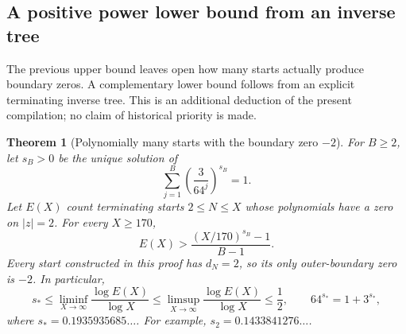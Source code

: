 \documentclass[11pt,a4paper]{article}
\newtheorem{theorem}{Theorem}[section]
\theoremstyle{definition}
\theoremstyle{remark}
\numberwithin{equation}{section}
\begin{document}
\subsection{A positive power lower bound from an inverse tree}
The previous upper bound leaves open how many starts actually produce
boundary zeros. A complementary lower bound follows from an explicit
terminating inverse tree. This is an additional deduction of the present
compilation; no claim of historical priority is made.

\begin{theorem}[Polynomially many starts with the boundary zero $-2$]
\label{C:thm:boundary-power-lower}
For $B\ge2$, let $s_B>0$ be the unique solution of
\[
 \sum_{j=1}^{B}\left(\frac{3}{64^j}\right)^{s_B}=1.
\]
Let $E(X)$ count terminating starts $2\le N\le X$ whose polynomials
have a zero on $|z|=2$. For every $X\ge170$,
\[
 E(X)>\frac{(X/170)^{s_B}-1}{B-1}.
\]
Every start constructed in this proof has $d_N=2$, so its only
outer-boundary zero is $-2$. In particular,
\begin{equation}\label{C:eq:boundary-exponent-bracket}
 s_*\le\liminf_{X\to\infty}\frac{\log E(X)}{\log X}
 \le\limsup_{X\to\infty}\frac{\log E(X)}{\log X}\le\frac12,
 \qquad 64^{s_*}=1+3^{s_*},
\end{equation}
where $s_*=0.1935935685\ldots$. For example,
$s_2=0.1433841276\ldots$.
\end{theorem}
\end{document}
